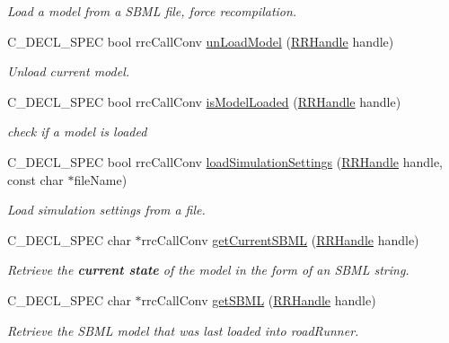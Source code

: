 \begin{DoxyCompactItemize}
\begin{DoxyCompactList}\small\item\em Load a model from a S\+B\+M\+L file, force recompilation. \end{DoxyCompactList}\item 
C\+\_\+\+D\+E\+C\+L\+\_\+\+S\+P\+E\+C bool rrc\+Call\+Conv \hyperlink{group__loadsave_ga53d8e3b97611797889b64601ec878559}{un\+Load\+Model} (\hyperlink{rrc__types_8h_a1d68f0592372208fa5a5f2799ea4b3ae}{R\+R\+Handle} handle)
\begin{DoxyCompactList}\small\item\em Unload current model. \end{DoxyCompactList}\item 
C\+\_\+\+D\+E\+C\+L\+\_\+\+S\+P\+E\+C bool rrc\+Call\+Conv \hyperlink{group__loadsave_ga1522e7efbb34bc40fd88376327a9535d}{is\+Model\+Loaded} (\hyperlink{rrc__types_8h_a1d68f0592372208fa5a5f2799ea4b3ae}{R\+R\+Handle} handle)
\begin{DoxyCompactList}\small\item\em check if a model is loaded \end{DoxyCompactList}\item 
C\+\_\+\+D\+E\+C\+L\+\_\+\+S\+P\+E\+C bool rrc\+Call\+Conv \hyperlink{group__loadsave_ga387b0694ce78f6f82e089cfade9faef8}{load\+Simulation\+Settings} (\hyperlink{rrc__types_8h_a1d68f0592372208fa5a5f2799ea4b3ae}{R\+R\+Handle} handle, const char $\ast$file\+Name)
\begin{DoxyCompactList}\small\item\em Load simulation settings from a file. \end{DoxyCompactList}\item 
C\+\_\+\+D\+E\+C\+L\+\_\+\+S\+P\+E\+C char $\ast$rrc\+Call\+Conv \hyperlink{group__loadsave_ga9e8bda764dbeedb6b377d2050f6254f9}{get\+Current\+S\+B\+M\+L} (\hyperlink{rrc__types_8h_a1d68f0592372208fa5a5f2799ea4b3ae}{R\+R\+Handle} handle)
\begin{DoxyCompactList}\small\item\em Retrieve the {\bfseries current state} of the model in the form of an S\+B\+M\+L string. \end{DoxyCompactList}\item 
C\+\_\+\+D\+E\+C\+L\+\_\+\+S\+P\+E\+C char $\ast$rrc\+Call\+Conv \hyperlink{group__loadsave_gae45f7a34ebfdc69fb71d8b559213cb4c}{get\+S\+B\+M\+L} (\hyperlink{rrc__types_8h_a1d68f0592372208fa5a5f2799ea4b3ae}{R\+R\+Handle} handle)
\begin{DoxyCompactList}\small\item\em Retrieve the S\+B\+M\+L model that was last loaded into road\+Runner. \end{DoxyCompactList}\end{DoxyCompactItemize}


